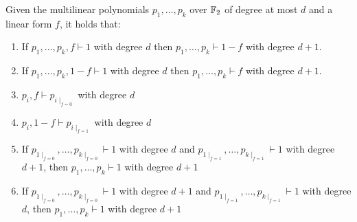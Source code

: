 \begin{lemma}
    \label{ns_properties}
 Given the multilinear polynomials $p_1, \ldots, p_k$ over $\mathbb{F}_2$ of degree at most $d$ and a linear form $f$, it holds that:
    \begin{enumerate}
        \item If $p_1, \ldots, p_k, f \vdash 1$ with degree $d$ then $p_1, \ldots, p_k \vdash 1-f$ with degree $d+1$.
        \item If $p_1, \ldots, p_k, 1-f \vdash 1$ with degree $d$ then $p_1, \ldots, p_k \vdash f$ with degree $d+1$.
        \item $p_i, f \vdash p_{i \mid_{f=0}}$ with degree $d$ 
        \item $p_i, 1-f \vdash p_{i \mid_{f=1}}$ with degree $d$ 
        \item If $p_{1\mid_{f=0}}, \ldots, p_{k\mid_{f=0}} \vdash 1$ with degree $d$ and $p_{1\mid_{f=1}}, \ldots, p_{k\mid_{f=1}} \vdash 1$ with degree $d+1$, then $p_1, \ldots, p_k \vdash 1$ with degree $d+1$
        \item If $p_{1\mid_{f=0}}, \ldots, p_{k\mid_{f=0}} \vdash 1$ with degree $d+1$ and $p_{1\mid_{f=1}}, \ldots, p_{k\mid_{f=1}} \vdash 1$ with degree $d$, then $p_1, \ldots, p_k \vdash 1$ with degree $d+1$
    \end{enumerate}
\end{lemma}

